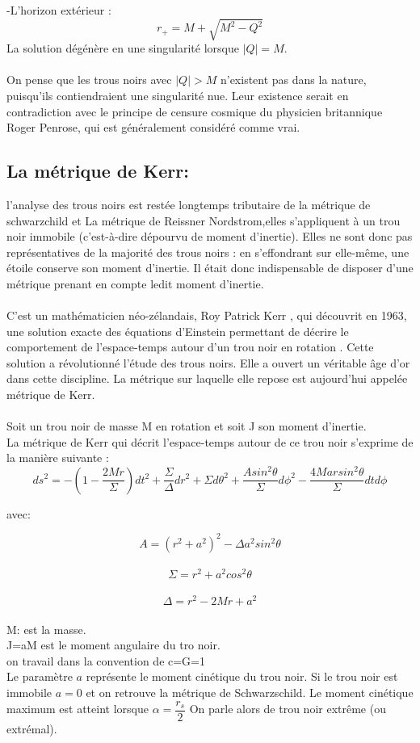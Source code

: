 -L’horizon extérieur :
\begin{equation}
r_{+} = M + \sqrt{M^{2}-Q^{2}}
\end{equation}
La solution dégénère en une singularité lorsque  $|Q|=M$.\\
\\
On pense que les trous noirs avec $ |Q|>M$ n'existent pas dans la nature, puisqu'ils contiendraient une singularité nue. Leur existence serait en contradiction avec le principe de censure cosmique du physicien britannique Roger Penrose, qui est généralement considéré comme vrai.
\subsection{La métrique de Kerr:}
l'analyse des trous noirs est restée longtemps tributaire de la métrique de schwarzchild et La métrique de Reissner Nordstrom,elles s'appliquent à un trou noir immobile (c’est-à-dire dépourvu de moment d’inertie). Elles ne sont donc pas représentatives de la majorité des trous noirs : en s’effondrant sur elle-même, une étoile conserve son moment d’inertie. Il était donc indispensable de disposer d’une métrique prenant en compte ledit moment d’inertie.\\
\\
C’est un mathématicien néo-zélandais, Roy Patrick Kerr , qui découvrit en 1963, une solution exacte des équations d’Einstein permettant de décrire le comportement de l’espace-temps autour d’un trou noir en rotation \cite{1}. Cette solution a révolutionné l’étude des trous noirs. Elle a ouvert un véritable âge d’or dans cette discipline. La métrique sur laquelle elle repose est aujourd’hui appelée métrique de Kerr.\\
\\
Soit un trou noir de masse M en rotation et soit J son moment d’inertie.\\

La métrique de Kerr qui décrit l’espace-temps autour de ce trou noir s’exprime de la manière suivante :
\begin{equation}
ds^{2}=-(1-\dfrac{2Mr}{\Sigma})dt^{2}+\dfrac{\Sigma}{\Delta}dr^{2}+\Sigma d\theta^{2}+\dfrac{Asin^{2}\theta}{\Sigma} d\phi^{2}-\dfrac{4Marsin^{2}\theta }{\Sigma} dt d\phi
\end{equation}

avec:

$$A=(r^{2}+a^{2})^{2}-\Delta a^{2}sin^{2}\theta$$
\\
$$\Sigma =r^{2}+a^{2}cos^{2}\theta$$
\\
$$\Delta=r^{2}-2Mr+a^{2}$$
\\
M: est la masse.\\
J=aM est le moment angulaire du tro noir.\\ on travail dans la convention de c=G=1\\
Le paramètre $a$ représente le moment cinétique du trou noir. Si le trou noir est immobile $ a= 0 $ et on retrouve la métrique de Schwarzschild. Le moment cinétique maximum est atteint lorsque $\alpha=\dfrac{r_{s}}{2}$ On parle alors de trou noir extrême (ou extrémal).
